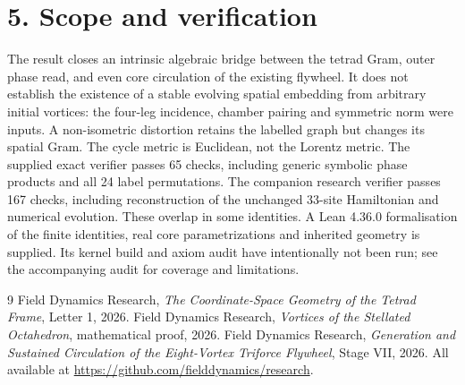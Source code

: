 \section*{5. Scope and verification}
The result closes an intrinsic algebraic bridge between the tetrad Gram, outer phase read, and even core circulation of the existing flywheel. It does not establish the existence of a stable evolving spatial embedding from arbitrary initial vortices: the four-leg incidence, chamber pairing and symmetric norm were inputs. A non-isometric distortion retains the labelled graph but changes its spatial Gram. The cycle metric is Euclidean, not the Lorentz metric. The supplied exact verifier passes 65 checks, including generic symbolic phase products and all 24 label permutations. The companion research verifier passes 167 checks, including reconstruction of the unchanged 33-site Hamiltonian and numerical evolution. These overlap in some identities. A Lean 4.36.0 formalisation of the finite identities, real core parametrizations and inherited geometry is supplied. Its kernel build and axiom audit have intentionally not been run; see the accompanying audit for coverage and limitations.
\begingroup\small\setlength{\parskip}{1pt}\begin{thebibliography}{9}\setlength{\itemsep}{0pt}
 Field Dynamics Research, \emph{The Coordinate-Space Geometry of the Tetrad Frame}, Letter 1, 2026.
 Field Dynamics Research, \emph{Vortices of the Stellated Octahedron}, mathematical proof, 2026.
 Field Dynamics Research, \emph{Generation and Sustained Circulation of the Eight-Vortex Triforce Flywheel}, Stage VII, 2026. All available at \url{https://github.com/fielddynamics/research}.
\end{thebibliography}\endgroup
